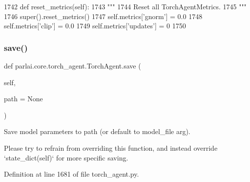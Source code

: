 \begin{DoxyCode}
1742     \textcolor{keyword}{def }reset\_metrics(self):
1743         \textcolor{stringliteral}{"""}
1744 \textcolor{stringliteral}{        Reset all TorchAgentMetrics.}
1745 \textcolor{stringliteral}{        """}
1746         super().reset\_metrics()
1747         self.metrics[\textcolor{stringliteral}{'gnorm'}] = 0.0
1748         self.metrics[\textcolor{stringliteral}{'clip'}] = 0.0
1749         self.metrics[\textcolor{stringliteral}{'updates'}] = 0
1750 
\end{DoxyCode}
\mbox{\label{classparlai_1_1core_1_1torch__agent_1_1TorchAgent_adac7ee3db855786e8414e9f35fcb6e46}} 
\subsubsection{\texorpdfstring{save()}{save()}}
{\footnotesize\ttfamily def parlai.\+core.\+torch\+\_\+agent.\+Torch\+Agent.\+save (\begin{DoxyParamCaption}\item[{}]{self,  }\item[{}]{path = {\ttfamily None} }\end{DoxyParamCaption})}

\begin{DoxyVerb}Save model parameters to path (or default to model_file arg).

Please try to refrain from overriding this function, and instead override
`state_dict(self)` for more specific saving.
\end{DoxyVerb}
 

Definition at line 1681 of file torch\+\_\+agent.\+py.


